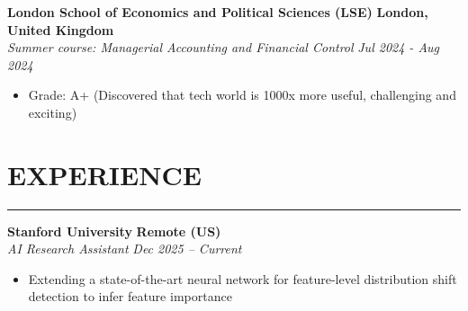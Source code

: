 \documentclass[a4paper,11pt]{article}
\newcommand{\sectionline}{
    \noindent\rule{\textwidth}{0.5pt} %
}
\newcommand{\cvsection}[1]{
    \section{#1} %
    \vspace{-1.0em} %
    \sectionline
}
\newenvironment{cvitemize}
  {\begin{itemize}}
  {\end{itemize}\vspace{0.8em}} %
\begin{document}
\noindent \textbf{London School of Economics and Political Sciences (LSE)} \hfill \textbf{London, United Kingdom} \\
\textit{Summer course: Managerial Accounting and Financial Control} \hfill \textit{Jul 2024 - Aug 2024} \\
\vspace{-1em} %
\begin{cvitemize}
    \item Grade: A+ (Discovered that tech world is 1000x more useful, challenging and exciting)
\end{cvitemize}



\vspace{0.25em} %

\cvsection{EXPERIENCE}
\noindent \textbf{Stanford University} \hfill \textbf{Remote (US)} \\
\textit{AI Research Assistant} \hfill \textit{Dec 2025 -- Current} \\
\vspace{-0.8em} %
\begin{cvitemize}
    \item Extending a state-of-the-art neural network for feature-level distribution shift detection to infer feature importance
\end{cvitemize}

\end{document}
